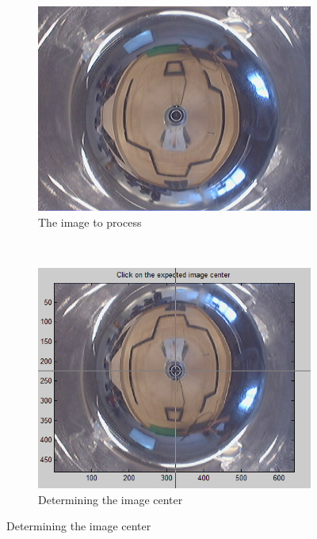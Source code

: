 \documentclass[12pt]{article}
\begin{document}
\begin{figure}[h!]
	\centering
	\begin{subfigure}[b]{0.4\textwidth}
		\includegraphics[width=\textwidth]{c.jpg}
		\caption{The image to process}
	\end{subfigure}
	~
	\begin{subfigure}[b]{0.4\textwidth}
		\includegraphics[width=\textwidth]{center.png}
		\caption{Determining the image center}
	\end{subfigure}


\end{figure}
\end{document}
